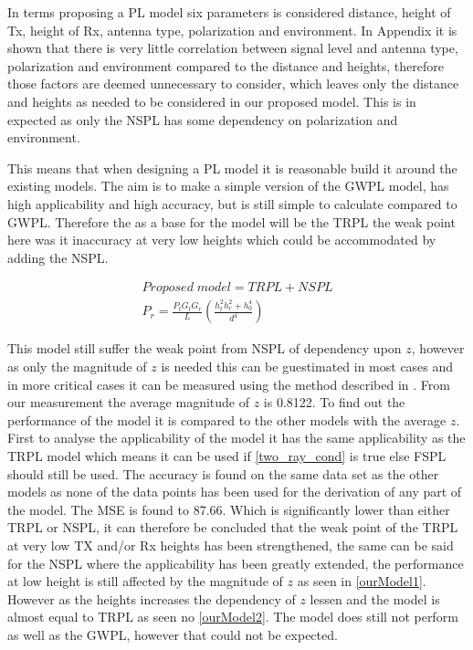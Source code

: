 


In terms proposing a PL model six parameters is considered distance, height of Tx, height of Rx, antenna type, polarization and environment. In Appendix it is shown that there is very little correlation between signal level and antenna type, polarization and environment compared to the distance and heights, therefore those factors are deemed unnecessary to consider, which leaves only the distance and heights as needed to be considered in our proposed model. This is in expected as only the NSPL has some dependency on polarization and environment. 

This means that when designing a PL model it is reasonable build it around the existing models. The aim is to make a simple version of the GWPL model, has high applicability and high accuracy, but is still simple to calculate compared to GWPL. Therefore the as a base for the model will be the TRPL the weak point here was it inaccuracy at very low heights which could be accommodated by adding the NSPL. 

\begin{align}
Proposed\; model = TRPL + NSPL \\
P_r = \frac{P_t G_t G_r }{L}\left(\frac{h_t^2 h_r^2+h_0^4}{d^4}\right)
\end{align}

This model still suffer the weak point from NSPL of dependency upon $z$, however as only the magnitude of $z$ is needed this can be guestimated in most cases and in more critical cases it can be measured using the method described in \cite{Kim}. From our measurement the average magnitude of $z$ is 0.8122. To find out the performance of the model it is compared to the other models with the average $z$. First to analyse the applicability of the model it has the same applicability as the TRPL model which means it can be used if \eqref{two_ray_cond} is true else FSPL should still be used. The accuracy is found on the same data set as the other models as none of the data points has been used for the derivation of any part of the model. The MSE is found to 87.66.
Which is significantly lower than either TRPL or NSPL, it can therefore be concluded that the weak point of the TRPL at very low TX and/or Rx heights has been strengthened, the same can be said for the NSPL where the applicability has been greatly extended, the performance at low height is still affected by the magnitude of $z$ as seen in \autoref{ourModel1}. However as the heights increases the dependency of $z$ lessen and the model is almost equal to TRPL as seen no \autoref{ourModel2}. The model does still not perform as well as the GWPL, however that could not be expected.

